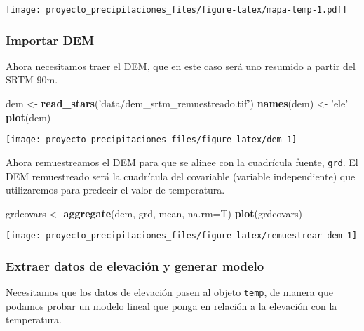 \documentclass[11pt,]{article}
\newenvironment{Shaded}{\begin{snugshade}}{\end{snugshade}}
\newcommand{\KeywordTok}[1]{\textcolor[rgb]{0.13,0.29,0.53}{\textbf{#1}}}
\newcommand{\DataTypeTok}[1]{\textcolor[rgb]{0.13,0.29,0.53}{#1}}
\newcommand{\DecValTok}[1]{\textcolor[rgb]{0.00,0.00,0.81}{#1}}
\newcommand{\StringTok}[1]{\textcolor[rgb]{0.31,0.60,0.02}{#1}}
\newcommand{\OperatorTok}[1]{\textcolor[rgb]{0.81,0.36,0.00}{\textbf{#1}}}
\newcommand{\NormalTok}[1]{#1}
\begin{document}
\texttt{[image: proyecto\_precipitaciones\_files/figure-latex/mapa-temp-1.pdf]}

\subsubsection{Importar DEM}\label{importar-dem}

Ahora necesitamos traer el DEM, que en este caso será uno resumido a
partir del SRTM-90m.

\begin{Shaded}
\begin{Highlighting}[]
\NormalTok{dem <-}\StringTok{ }\KeywordTok{read_stars}\NormalTok{(}\StringTok{'data/dem_srtm_remuestreado.tif'}\NormalTok{)}
\KeywordTok{names}\NormalTok{(dem) <-}\StringTok{ 'ele'}
\KeywordTok{plot}\NormalTok{(dem)}
\end{Highlighting}
\end{Shaded}

\texttt{[image: proyecto\_precipitaciones\_files/figure-latex/dem-1]}

Ahora remuestreamos el DEM para que se alinee con la cuadrícula fuente,
\texttt{grd}. El DEM remuestreado será la cuadrícula del covariable
(variable independiente) que utilizaremos para predecir el valor de
temperatura.

\begin{Shaded}
\begin{Highlighting}[]
\NormalTok{grdcovars <-}\StringTok{ }\KeywordTok{aggregate}\NormalTok{(dem, grd, mean, }\DataTypeTok{na.rm=}\NormalTok{T)}
\KeywordTok{plot}\NormalTok{(grdcovars)}
\end{Highlighting}
\end{Shaded}

\texttt{[image: proyecto\_precipitaciones\_files/figure-latex/remuestrear-dem-1]}

\subsubsection{Extraer datos de elevación y generar
modelo}\label{extraer-datos-de-elevaciuxf3n-y-generar-modelo}

Necesitamos que los datos de elevación pasen al objeto \texttt{temp}, de
manera que podamos probar un modelo lineal que ponga en relación a la
elevación con la temperatura.

\begin{Shaded}
\end{Shaded}
\end{document}
